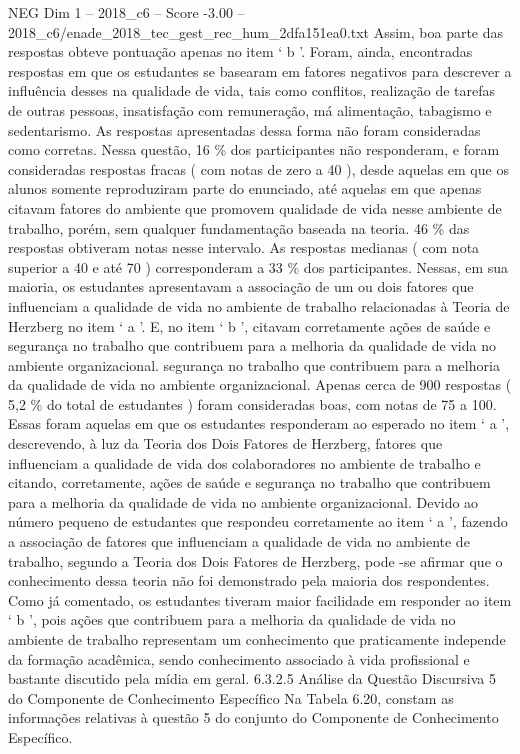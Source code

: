 \begin{textsample}{NEG Dim 1 – 2018\_c6 – Score -3.00 – 2018\_c6/enade\_2018\_tec\_gest\_rec\_hum\_2dfa151ea0.txt}
Assim, boa parte das respostas obteve pontuação apenas no item ‘ b ’.
Foram, ainda, encontradas respostas em que os estudantes se basearam em fatores negativos para descrever a influência desses na qualidade de vida, tais como conflitos, realização de tarefas de outras pessoas, insatisfação com remuneração, má alimentação, tabagismo e sedentarismo.
As respostas apresentadas dessa forma não foram consideradas como corretas.
Nessa questão, 16 \% dos participantes não responderam, e foram consideradas respostas fracas ( com notas de zero a 40 ), desde aquelas em que os alunos somente reproduziram parte do enunciado, até aquelas em que apenas citavam fatores do ambiente que promovem qualidade de vida nesse ambiente de trabalho, porém, sem qualquer fundamentação baseada na teoria. 46 \% das respostas obtiveram notas nesse intervalo.
As respostas medianas ( com nota superior a 40 e até 70 ) corresponderam a 33 \% dos participantes.
Nessas, em sua maioria, os estudantes apresentavam a associação de um ou dois fatores que influenciam a qualidade de vida no ambiente de trabalho relacionadas à Teoria de Herzberg no item ‘ a ’.
E, no item ‘ b ’, citavam corretamente ações de saúde e segurança no trabalho que contribuem para a melhoria da qualidade de vida no ambiente organizacional. segurança no trabalho que contribuem para a melhoria da qualidade de vida no ambiente organizacional.
Apenas cerca de 900 respostas ( 5,2 \% do total de estudantes ) foram consideradas boas, com notas de 75 a 100.
Essas foram aquelas em que os estudantes responderam ao esperado no item ‘ a ’, descrevendo, à luz da Teoria dos Dois Fatores de Herzberg, fatores que influenciam a qualidade de vida dos colaboradores no ambiente de trabalho e citando, corretamente, ações de saúde e segurança no trabalho que contribuem para a melhoria da qualidade de vida no ambiente organizacional.
Devido ao número pequeno de estudantes que respondeu corretamente ao item ‘ a ’, fazendo a associação de fatores que influenciam a qualidade de vida no ambiente de trabalho, segundo a Teoria dos Dois Fatores de Herzberg, pode -se afirmar que o conhecimento dessa teoria não foi demonstrado pela maioria dos respondentes.
Como já comentado, os estudantes tiveram maior facilidade em responder ao item ‘ b ’, pois ações que contribuem para a melhoria da qualidade de vida no ambiente de trabalho representam um conhecimento que praticamente independe da formação acadêmica, sendo conhecimento associado à vida profissional e bastante discutido pela mídia em geral. 6.3.2.5 Análise da Questão Discursiva 5 do Componente de Conhecimento Específico Na Tabela 6.20, constam as informações relativas à questão 5 do conjunto do Componente de Conhecimento Específico.

\end{textsample}
